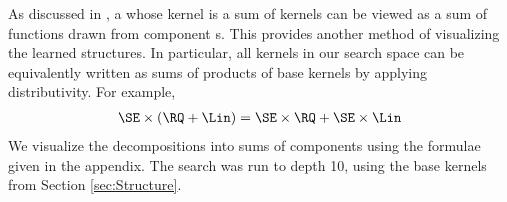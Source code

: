 As discussed in , a \gp{} whose kernel is a sum of kernels can be viewed as a sum of functions drawn from component \gp{}s.
This provides another method of visualizing the learned structures.
In particular, all kernels in our search space can be equivalently written as sums of products of base kernels by applying distributivity. For example,
%
\begin{align}
\SE \times (\RQ + \Lin) = \SE \times \RQ + \SE \times \Lin
\end{align}
%
We visualize the decompositions into sums of components using the formulae given in the appendix.
%
%
%
%
%
The search was run to depth 10, using the base kernels from Section \ref{sec:Structure}.



